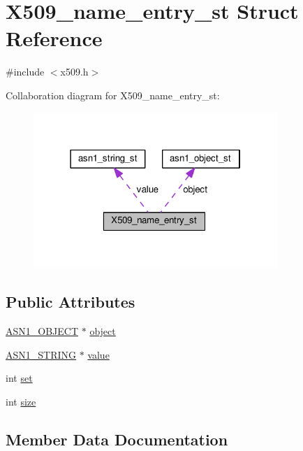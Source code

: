 \hypertarget{struct_x509__name__entry__st}{}\section{X509\+\_\+name\+\_\+entry\+\_\+st Struct Reference}
\label{struct_x509__name__entry__st}


{\ttfamily \#include $<$x509.\+h$>$}



Collaboration diagram for X509\+\_\+name\+\_\+entry\+\_\+st\+:
\nopagebreak
\begin{figure}[H]
\begin{center}
\leavevmode
\includegraphics[width=262pt]{struct_x509__name__entry__st__coll__graph}
\end{center}
\end{figure}
\subsection*{Public Attributes}
\begin{DoxyCompactItemize}
\item 
\hyperlink{asn1_8h_ae10c08e4e6b23f67a39b2add932ec48f}{A\+S\+N1\+\_\+\+O\+B\+J\+E\+CT} $\ast$ \hyperlink{struct_x509__name__entry__st_afb5c2cccc0186d9b6c232d1abee1600d}{object}
\item 
\hyperlink{ossl__typ_8h_ad37610875e38aa6c59f5e6e0b437e65c}{A\+S\+N1\+\_\+\+S\+T\+R\+I\+NG} $\ast$ \hyperlink{struct_x509__name__entry__st_ac667219a50c24b022ad59fbd4b0161dd}{value}
\item 
int \hyperlink{struct_x509__name__entry__st_a9c2a931466331baa5b1566029e4e2159}{set}
\item 
int \hyperlink{struct_x509__name__entry__st_a26441098da53088784c4eb95d3a2d2f7}{size}
\end{DoxyCompactItemize}


\subsection{Member Data Documentation}

